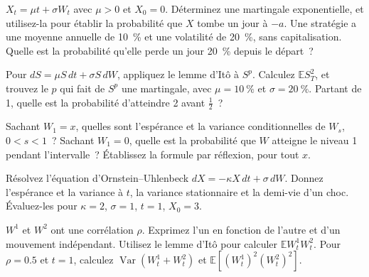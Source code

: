 \begin{question}\label{iq:iv1:stochastic-calculus:12}
$X_t = \mu t + \sigma W_t$ avec $\mu > 0$ et $X_0 = 0$. Déterminez une martingale exponentielle, et utilisez-la pour établir la probabilité que $X$ tombe un jour à $-a$. Une stratégie a une moyenne annuelle de 10~\% et une volatilité de 20~\%, sans capitalisation. Quelle est la probabilité qu'elle perde un jour 20~\% depuis le départ~?
\end{question}

\begin{question}\label{iq:iv1:stochastic-calculus:13}
Pour $dS = \mu S\,dt + \sigma S\,dW$, appliquez le lemme d'Itô à $S^p$. Calculez $\mathbb{E}S_T^2$, et trouvez le $p$ qui fait de $S^p$ une martingale, avec $\mu = 10~\%$ et $\sigma = 20~\%$. Partant de 1, quelle est la probabilité d'atteindre 2 avant $\frac12$~?
\end{question}

\begin{question}\label{iq:iv1:stochastic-calculus:14}
Sachant $W_1 = x$, quelles sont l'espérance et la variance conditionnelles de $W_s$, $0 < s < 1$~? Sachant $W_1 = 0$, quelle est la probabilité que $W$ atteigne le niveau 1 pendant l'intervalle~? Établissez la formule par réflexion, pour tout $x$.
\end{question}

\begin{question}\label{iq:iv1:stochastic-calculus:15}
Résolvez l'équation d'Ornstein--Uhlenbeck $dX = -\kappa X\,dt + \sigma\,dW$. Donnez l'espérance et la variance à $t$, la variance stationnaire et la demi-vie d'un choc. Évaluez-les pour $\kappa = 2$, $\sigma = 1$, $t = 1$, $X_0 = 3$.
\end{question}

\begin{question}\label{iq:iv1:stochastic-calculus:16}
$W^1$ et $W^2$ ont une corrélation $\rho$. Exprimez l'un en fonction de l'autre et d'un mouvement indépendant. Utilisez le lemme d'Itô pour calculer $\mathbb{E}W^1_tW^2_t$. Pour $\rho = 0.5$ et $t = 1$, calculez $\operatorname{Var}(W^1_t + W^2_t)$ et $\mathbb{E}[(W^1_t)^2(W^2_t)^2]$.
\end{question}

